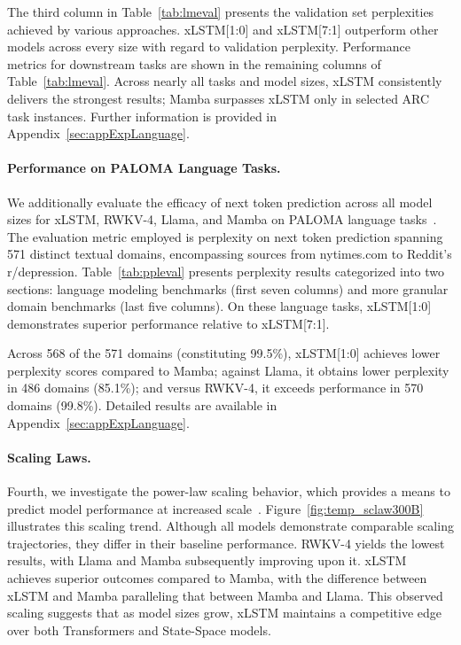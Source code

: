 The third column in Table~\ref{tab:lmeval} presents the validation set perplexities achieved by various approaches. xLSTM[1:0] and xLSTM[7:1] outperform other models across every size with regard to validation perplexity. Performance metrics for downstream tasks are shown in the remaining columns of Table~\ref{tab:lmeval}. Across nearly all tasks and model sizes, xLSTM consistently delivers the strongest results; Mamba surpasses xLSTM only in selected ARC task instances. Further information is provided in Appendix~\ref{sec:appExpLanguage}.

\paragraph{Performance on PALOMA Language Tasks.} We additionally evaluate the efficacy of next token prediction across all model sizes for xLSTM, RWKV-4, Llama, and Mamba on PALOMA language tasks~\citep{Magnusson:23arxivshort}. The evaluation metric employed is perplexity on next token prediction spanning 571 distinct textual domains, encompassing sources from nytimes.com to Reddit’s r/depression.
Table~\ref{tab:ppleval} presents perplexity results categorized into two sections: language modeling benchmarks (first seven columns) and more granular domain benchmarks (last five columns). On these language tasks, xLSTM[1:0] demonstrates superior performance relative to xLSTM[7:1].

Across 568 of the 571 domains (constituting 99.5\%), xLSTM[1:0] achieves lower perplexity scores compared to Mamba; against Llama, it obtains lower perplexity in 486 domains (85.1\%); and versus RWKV-4, it exceeds performance in 570 domains (99.8\%). Detailed results are available in Appendix~\ref{sec:appExpLanguage}.

\paragraph{Scaling Laws.} Fourth, we investigate the power-law scaling behavior, which provides a means to predict model performance at increased scale~\citep{Kaplan:20,Brown:20short}. Figure~\ref{fig:temp_sclaw300B} illustrates this scaling trend. Although all models demonstrate comparable scaling trajectories, they differ in their baseline performance. RWKV-4 yields the lowest results, with Llama and Mamba subsequently improving upon it. xLSTM achieves superior outcomes compared to Mamba, with the difference between xLSTM and Mamba paralleling that between Mamba and Llama. This observed scaling suggests that as model sizes grow, xLSTM maintains a competitive edge over both Transformers and State-Space models.

